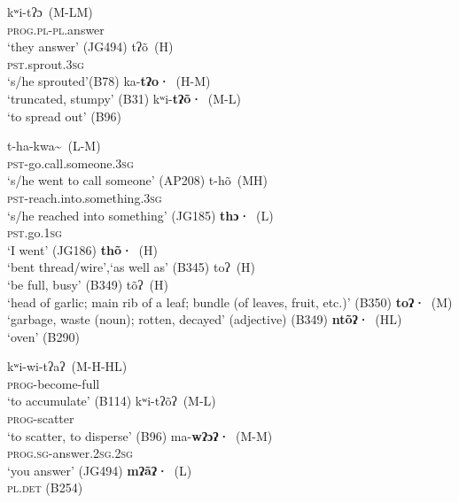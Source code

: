 \documentclass[output=paper]{langscibook}
\begin{document}
\ea
{}
     {\gll kʷi-tʔɔ~(M-LM) \\
          \textsc{prog.pl-pl}.answer\\
          \glt ‘they answer’  (JG494)
     }
     {\gll tʔõ~(H)\\
          \textsc{pst}.sprout.3\textsc{sg}\\
          \glt ‘s/he sprouted’(B78)
     }
     {ka-\textbf{tʔo·}~(H-M) \\
          \glt ‘truncated, stumpy’  (B31)
     }
     {kʷi-\textbf{tʔõ·}~(M-L) \\
          \glt ‘to spread out’  (B96)
     }
\z


\ea
{}
     {\gll t-ha-kwa\~{}~(L-M)\\
          \textsc{pst}-go.call.someone.3\textsc{sg}\\
          \glt ‘s/he went to call someone’  (AP208)
     }
     {\gll  t-hõ~(MH)\\
          \textsc{pst}-reach.into.something.3\textsc{sg}\\
          \glt ‘s/he reached into something’  (JG185)
     }
     {\gll \textbf{thɔ·}~(L)\\
               \textsc{pst}.go.1\textsc{sg}\\
               \glt ‘I went’  (JG186)
     }
     {\textbf{thõ·}~(H) \\
          \glt ‘bent thread/wire’,\glt ‘as well as’  (B345)
     }
\z
\clearpage
\ea
{}
     {toʔ~(H) \\
          \glt ‘be full, busy’  (B349)
     }
     {tõʔ~(H)\\
          \glt ‘head of garlic; main rib of a leaf; bundle (of leaves, fruit, etc.)’  (B350)
     }
     {\textbf{toʔ·}~(M)\\
          \glt ‘garbage, waste (noun); rotten, decayed’  (adjective)  (B349)
     }
     {\textbf{ntõʔ·}~(HL)\\
          \glt ‘oven’  (B290)
     }
\z

\ea
{}
     {\gll kʷi-wi-tʔaʔ~(M-H-HL) \\
          \textsc{prog}-become-full\\
          \glt ‘to accumulate’  (B114)
     }
     {\gll kʷi-tʔõʔ~(M-L) \\
          \textsc{prog}-scatter\\
          \glt ‘to scatter, to disperse’  (B96)
     }
     {\gll ma-\textbf{wʔɔʔ·}~(M-M)\\
          \textsc{prog.sg}-answer.2\textsc{sg}.2\textsc{sg}\\
          \glt ‘you answer’  (JG494)
     }
     {\gll \textbf{mʔãʔ·}~(L)\\
          \textsc{pl.det} (B254)\\
     }
\z
\end{document}
